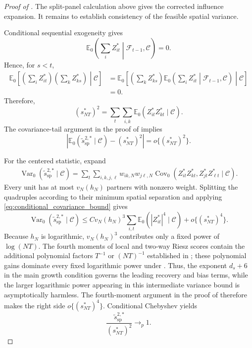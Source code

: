 \documentclass[11pt]{article}
\numberwithin{equation}{section}
\theoremstyle{remark}
\newcommand{\Ezero}{\mathbb E_0}
\begin{document}
\begin{proof}[Proof of ]
The split-panel calculation above gives the corrected influence expansion. It remains to establish consistency of the feasible spatial variance.

Conditional sequential exogeneity gives
$$
\Ezero\left(
\sum_i Z_{it}^{*}
\middle|
\mathscr F_{t-1},\mathscr C
\right)
=
0.
$$
Hence, for $s<t$,
\begin{align*}
\Ezero\left[
\left(\sum_i Z_{it}^{*}\right)
\left(\sum_k Z_{ks}^{*}\right)
\middle|\mathscr C
\right]
&=
\Ezero\left[
\left(\sum_k Z_{ks}^{*}\right)
\Ezero\left(
\sum_i Z_{it}^{*}
\middle|
\mathscr F_{t-1},\mathscr C
\right)
\middle|\mathscr C
\right]\\
&=0.
\end{align*}
Therefore,
$$
(s_{NT}^{*})^2
=
\sum_t\sum_{i,k}
\Ezero(Z_{it}^{*}Z_{kt}^{*}\mid\mathscr C).
$$
The covariance-tail argument in the proof of  implies
$$
\left|
\Ezero(\widetilde s_{\mathrm{sp}}^{2,*}\mid\mathscr C)
-
(s_{NT}^{*})^2
\right|
=
o\{(s_{NT}^{*})^2\}.
$$

For the centered statistic, expand
\begin{align*}
\operatorname{Var}_0(
\widetilde s_{\mathrm{sp}}^{2,*}
\mid\mathscr C)
=
\sum_t
\sum_{i,k,j,\ell}
w_{ik,N}w_{j\ell,N}
\operatorname{Cov}_0(
Z_{it}^{*}Z_{kt}^{*},
Z_{jt}^{*}Z_{\ell t}^{*}
\mid\mathscr C).
\end{align*}
Every unit has at most $v_N(h_N)$ partners with nonzero weight. Splitting the quadruples according to their minimum spatial separation and applying \eqref{eq:conditional_covariance_bound} gives
$$
\operatorname{Var}_0(
\widetilde s_{\mathrm{sp}}^{2,*}
\mid\mathscr C)
\le
C v_N(h_N)^3
\sum_{i,t}
\Ezero(|Z_{it}^{*}|^4\mid\mathscr C)
+
o\{(s_{NT}^{*})^4\}.
$$
Because $h_N$ is logarithmic, $v_N(h_N)^3$ contributes only a fixed power of $\log(NT)$. The fourth moments of local and two-way Riesz scores contain the additional polynomial factors $T^{-1}$ or $(NT)^{-1}$ established in ; these polynomial gains dominate every fixed logarithmic power under . Thus, the exponent $d_s+6$ in the main growth condition governs the leading recovery and bias terms, while the larger logarithmic power appearing in this intermediate variance bound is asymptotically harmless. The fourth-moment argument in the proof of  therefore makes the right side $o\{(s_{NT}^{*})^4\}$. Conditional Chebyshev yields
$$
\frac{
\widetilde s_{\mathrm{sp}}^{2,*}
}{
(s_{NT}^{*})^2
}
\to_p1.
$$


\end{proof}
\end{document}
